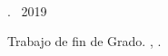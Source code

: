 

\thispagestyle{empty}

\begin{center}
    \textsc{\miNombre} \\ \medskip                        

    \begingroup
        \textsc{\miTitulo}
    \endgroup
\end{center}        

\newpage

\thispagestyle{empty}

\hfill

\vfill

\begin{flushleft}
\noindent\miNombre \textit{\miTitulo}. \textcopyright\ 2019\\\bigskip

Trabajo de fin de Grado. \miGrado, \miUniversidad.
\end{flushleft}

\endinput
